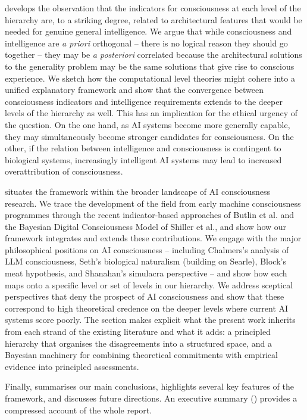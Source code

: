 \documentclass[11pt, a4paper, onecolumn, gdm]{google}
\begin{document}
 develops the observation that the indicators for consciousness at each level of the hierarchy are, to a striking degree, related to architectural features that would be needed for genuine general intelligence.
We argue that while consciousness and intelligence are \emph{a priori} orthogonal -- there is no logical reason they should go together -- they may be \emph{a posteriori} correlated because the architectural solutions to the generality problem may be the same solutions that give rise to conscious experience.
We sketch how the computational level theories might cohere into a unified explanatory framework and show that the convergence between consciousness indicators and intelligence requirements extends to the deeper levels of the hierarchy as well.
This has an implication for the ethical urgency of the question. On the one hand, as AI systems become more generally capable, they may simultaneously become stronger candidates for consciousness. On the other, if the relation between intelligence and consciousness is contingent to biological systems, increasingly intelligent AI systems may lead to increased overattribution of consciousness.

 situates the framework within the broader landscape of AI consciousness research.
We trace the development of the field from early machine consciousness programmes through the recent indicator-based approaches of Butlin et al. and the Bayesian Digital Consciousness Model of Shiller et al., and show how our framework integrates and extends these contributions.
We engage with the major philosophical positions on AI consciousness -- including Chalmers's analysis of LLM consciousness, Seth's biological naturalism (building on Searle), Block's meat hypothesis, and Shanahan's simulacra perspective -- and show how each maps onto a specific level or set of levels in our hierarchy.
We address sceptical perspectives that deny the prospect of AI consciousness and show that these correspond to high theoretical credence on the deeper levels where current AI systems score poorly.
The section makes explicit what the present work inherits from each strand of the existing literature and what it adds: a principled hierarchy that organises the disagreements into a structured space, and a Bayesian machinery for combining theoretical commitments with empirical evidence into principled assessments.

Finally,  summarises our main conclusions, highlights several key features of the framework, and discusses future directions.
An executive summary () provides a compressed account of the whole report.
\end{document}
